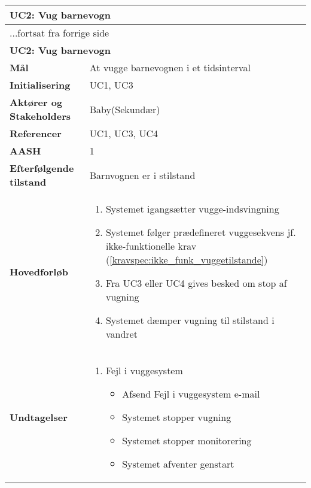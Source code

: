 \begin{center} \centering \label{kravspec:uc2}
	\begin{longtable}{|p{5cm}|p{9cm}|}  %
	\hline
		\multicolumn{2}{|l|}{\textbf{UC2: Vug barnevogn}} \\\hline %
		\endfirsthead
		
		\multicolumn{2}{l}{...fortsat fra forrige side} \\ \hline %
		\multicolumn{2}{|l|}{\textbf{UC2: Vug barnevogn}} \\\hline %
		\endhead	
		
		\textbf{Mål}							&At vugge barnevognen i et tidsinterval		\\\hline
		\textbf{Initialisering}				&UC1, UC3 \\\hline
		\textbf{Aktører og Stakeholders}		&Baby(Sekundær)		\\\hline 
		\textbf{Referencer}					&UC1, UC3, UC4		\\\hline
		\textbf{AASH}						&1		\\\hline
		\textbf{Efterfølgende tilstand}		&Barnvognen er i stilstand	\\\hline
		\textbf{Hovedforløb}					
			&\begin{enumerate}
	
				\item Systemet igangsætter vugge-indsvingning
				
				\item \label{kravspec:uc2_vugning}Systemet følger prædefineret vuggesekvens jf. ikke-funktionelle krav (\ref{kravspec:ikke_funk_vuggetilstande})
				\newline [Und: \ref{kravspec:uc2_vugning}.a Fejl i vuggesystem]	
				
				\item \label{kravspec:uc2_stopvugning}Fra UC3 eller UC4 	gives besked om stop af vugning	
				
				\item Systemet dæmper vugning til stilstand i vandret
				
			\end{enumerate}
		\\\hline
		\textbf{Undtagelser}
			&\begin{enumerate}[label=\ref{kravspec:uc2_vugning}.a]
			\item Fejl i vuggesystem
					\begin{itemize}
					
					\item Afsend Fejl i vuggesystem e-mail
					\item Systemet stopper vugning
					\item Systemet stopper monitorering
					\item Systemet afventer genstart
					\end{itemize}
			\end{enumerate}
		\\\hline
	\end{longtable} 
\end{center}


